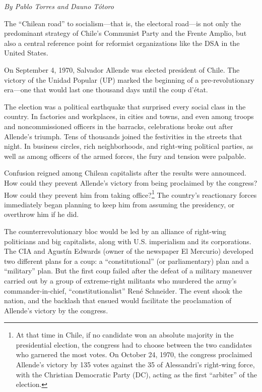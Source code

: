 \emph{By Pablo Torres and Dauno T\'{o}toro}

The ``Chilean road'' to socialism---that is, the electoral road---is not only the predominant strategy of Chile's Communist Party and the Frente Amplio, but also a central reference point for reformist organizations like the DSA in the United States.

On September 4, 1970, Salvador Allende was elected president of Chile. The victory of the Unidad Popular (UP) marked the beginning of a pre-revolutionary era---one that would last one thousand days until the coup d'\'{e}tat.

The election was a political earthquake that surprised every social class in the country. In factories and workplaces, in cities and towns, and even among troops and noncommissioned officers in the barracks, celebrations broke out after Allende's triumph. Tens of thousands joined the festivities in the streets that night. In business circles, rich neighborhoods, and right-wing political parties, as well as among officers of the armed forces, the fury and tension were palpable.

Confusion reigned among Chilean capitalists after the results were announced. How could they prevent Allende's victory from being proclaimed by the congress? How could they prevent him from taking office?\footnote{At that time in Chile, if no candidate won an absolute majority in the presidential election, the congress had to choose between the two candidates who garnered the most votes. On October 24, 1970, the congress proclaimed Allende's victory by 135 votes against the 35 of Alessandri's right-wing force, with the Christian Democratic Party (DC), acting as the first ``arbiter'' of the election.} The country's reactionary forces immediately began planning to keep him from assuming the presidency, or overthrow him if he did.

The counterrevolutionary bloc would be led by an alliance of right-wing politicians and big capitalists, along with U.S. imperialism and its corporations. The CIA and Agust\'{i}n Edwards (owner of the newspaper El Mercurio) developed two different plans for a coup: a ``constitutional'' (or parliamentary) plan and a ``military'' plan. But the first coup failed after the defeat of a military maneuver carried out by a group of extreme-right militants who murdered the army's commander-in-chief, ``constitutionalist'' Ren\'{e} Schneider. The event shook the nation, and the backlash that ensued would facilitate the proclamation of Allende's victory by the congress.

